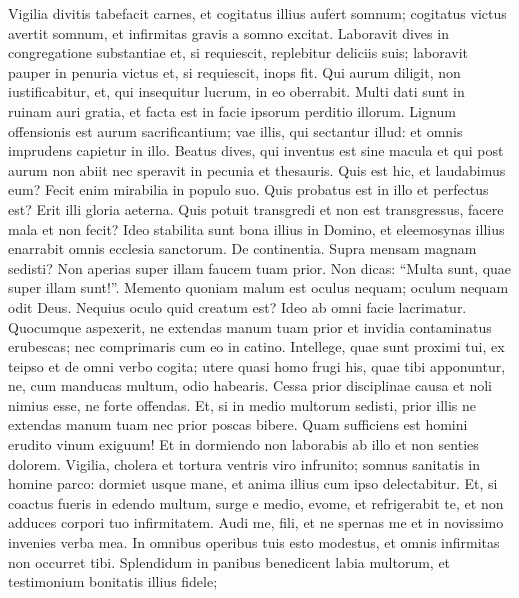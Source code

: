 \begin{biblechapter}  
\verse Vigilia divitis tabefacit carnes, et cogitatus illius aufert somnum; 
\verse cogitatus victus avertit somnum, et infirmitas gravis a somno excitat. 
\verse Laboravit dives in congregatione substantiae et, si requiescit, replebitur deliciis suis; 
\verse laboravit pauper in penuria victus et, si requiescit, inops fit. 
\verse Qui aurum diligit, non iustificabitur, et, qui insequitur lucrum, in eo oberrabit. 
\verse Multi dati sunt in ruinam auri gratia, et facta est in facie ipsorum perditio illorum. 
\verse Lignum offensionis est aurum sacrificantium; vae illis, qui sectantur illud: et omnis imprudens capietur in illo. 
\verse Beatus dives, qui inventus est sine macula et qui post aurum non abiit nec speravit in pecunia et thesauris. 
\verse Quis est hic, et laudabimus eum? Fecit enim mirabilia in populo suo. 
\verse Quis probatus est in illo et perfectus est? Erit illi gloria aeterna. Quis potuit transgredi et non est transgressus, facere mala et non fecit? 
\verse Ideo stabilita sunt bona illius in Domino, et eleemosynas illius enarrabit omnis ecclesia sanctorum. 
\verse De continentia. Supra mensam magnam sedisti? Non aperias super illam faucem tuam prior. 
\verse Non dicas: “Multa sunt, quae super illam sunt!”. 
\verse Memento quoniam malum est oculus nequam; oculum nequam odit Deus. 
\verse Nequius oculo quid creatum est? Ideo ab omni facie lacrimatur. 
\verse Quocumque aspexerit, ne extendas manum tuam prior et invidia contaminatus erubescas; 
\verse nec comprimaris cum eo in catino. 
\verse Intellege, quae sunt proximi tui, ex teipso et de omni verbo cogita; 
\verse utere quasi homo frugi his, quae tibi apponuntur, ne, cum manducas multum, odio habearis. 
\verse Cessa prior disciplinae causa et noli nimius esse, ne forte offendas. 
\verse Et, si in medio multorum sedisti, prior illis ne extendas manum tuam nec prior poscas bibere. 
\verse Quam sufficiens est homini erudito vinum exiguum! Et in dormiendo non laborabis ab illo et non senties dolorem. 
\verse Vigilia, cholera et tortura ventris viro infrunito; 
\verse somnus sanitatis in homine parco: dormiet usque mane, et anima illius cum ipso delectabitur. 
\verse Et, si coactus fueris in edendo multum, surge e medio, evome, et refrigerabit te, et non adduces corpori tuo infirmitatem. 
\verse Audi me, fili, et ne spernas me et in novissimo invenies verba mea. 
\verse In omnibus operibus tuis esto modestus, et omnis infirmitas non occurret tibi. 
\verse Splendidum in panibus benedicent labia multorum, et testimonium bonitatis illius fidele; 

\end{biblechapter}
